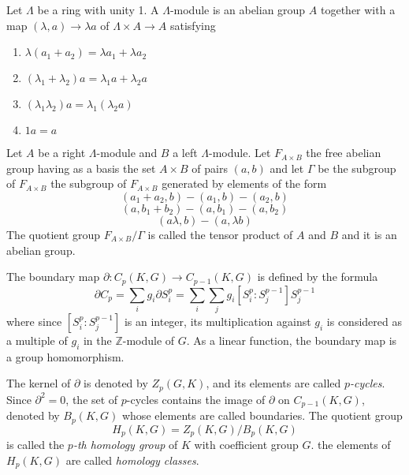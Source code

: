 \begin{defn}

	Let $ \Lambda$ be a ring with unity 1. A $ \Lambda$-module is an abelian group $A$ together with a map $ \left( \lambda,a \right) \to \lambda a$ of $ \Lambda \times A \to A$ satisfying
	\begin{enumerate}
		\item $ \lambda ( a_1 + a_2) = \lambda a_1 + \lambda a_2$
		\item $ ( \lambda_1 + \lambda_2) a = \lambda_1 a + \lambda_2 a$
		\item $ ( \lambda_1 \lambda_2) a = \lambda_1 \left( \lambda_2 a \right)$
		\item $1a=a$
	\end{enumerate}
\end{defn}


\begin{defn}

	Let $A$ be a right $ \Lambda$-module and $B$ a left $ \Lambda$-module. Let $F_{ A \times B }$ the free abelian group having as a basis the set $A \times B$ of pairs $(a,b)$ and let $ \Gamma$ be the subgroup of $F_{ A \times B }$ the subgroup of $F_{ A \times B }$ generated by elements of the form
	\[
		(a_1 + a_2,b) - (a_1,b) - (a_2,b)
	\]
	\[
		(a,b_1 + b_2) - (a,b_1) - (a,b_2)
	\]
	\[
		(a \lambda, b) - (a, \lambda b)
	\]
	The quotient group $ F_{ A \times B } / \Gamma$ is called the tensor product of $A$ and $B$ and it is an abelian group.

\end{defn}

\begin{defn}

	The boundary map $ \partial: C_p(K,G) \to C_{ p-1 }(K,G)$ is defined by the formula
	\[
	\partial C_p = \sum_i g_i \partial S^p_i = \sum_i \sum_j g_i \left[ S^p_i : S^{ p-1 }_j \right] S^{ p-1 }_j
	\]
	where since $ \left[ S^p_i : S^{ p-1 }_j \right]$ is an integer, its multiplication against $g_i$ is considered as a multiple of $g_i$ in the $ \mathbb{Z}$-module of $G$. As a linear function, the boundary map is a group homomorphism.

\end{defn}

\begin{defn}

	The kernel of $ \partial$ is denoted by $Z_p(G,K)$, and its elements are called \textit{$p$-cycles}. Since $ \partial^2 = 0$, the set of $p$-cycles contains the image of $\partial$ on $C_{ p-1 }(K,G)$, denoted by $B_p(K,G)$ whose elements are called boundaries. The quotient group
	\[
		H_p(K,G) = Z_p(K,G)/B_p(K,G)
	\]
	is called the \textit{$p$-th homology group} of $K$ with coefficient group $G$. the elements of $H_p(K,G)$ are called \textit{homology classes}.

\end{defn}

